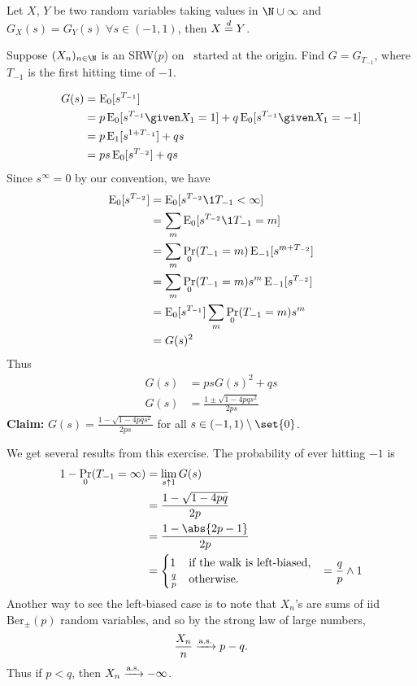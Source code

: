 \begin{fact} \label{thm:pgf}
    Let $X$, $Y$ be two random variables taking values in $\N \cup \infty$ and
    $G_X(s) = G_Y(s) \;\forall s \in (-1, 1)$, then $X \overset{d}{=} Y$.
\end{fact}

\begin{exercise}
    Suppose $(X_n)_{n \in \N}$ is an SRW($p$) on \Z\ started at the origin.
    Find $G = G_{T_{-1}}$, where $T_{-1}$ is the first hitting time of $-1$.
\end{exercise}
\begin{solution}
    \begin{align*}
        G(s) &= \E_0[s^{T_{-1}}] \\
            &= p \E_0[s^{T_{-1}} \given X_1 = 1]
                + q \E_0[s^{T_{-1}} \given X_1 = -1] \\
            &= p \E_1[s^{1 + T_{-1}}] + q s \\
            &= p s \E_0[s^{T_{-2}}] + q s
    \end{align*}
    Since $s^\infty = 0$ by our convention, we have \begin{align*}
        \E_0[s^{T_{-2}}] &= \E_0[s^{T_{-2}} \1{T_{-1} < \infty}] \\
            &= \sum_{m} \E_0[s^{T_{-2}} \1{T_{-1} = m}] \\
            &= \sum_{m} \Pr_0(T_{-1} = m) \E_{-1}[s^{m + T_{-2}}] \\
            &= \sum_{m} \Pr_0(T_{-1} = m) s^m \E_{-1}[s^{T_{-2}}] \\
            &= \E_0[s^{T_{-1}}] \sum_{m} \Pr_0(T_{-1} = m) s^m \\
            &= G(s)^2
    \end{align*}
    Thus \begin{align*}
        G(s) &= p s G(s)^2 + q s \\
        G(s) &= \frac{1 \pm \sqrt{1 - 4pq s^2}}{2ps}
    \end{align*}
    \textbf{Claim:} $G(s) = \frac{1 - \sqrt{1 - 4pqs^2}}{2ps}$ for all
    $s \in (-1, 1) \setminus \set{0}$.
\end{solution}
We get several results from this exercise.
The probability of ever hitting $-1$ is \begin{align*}
    1 - \Pr_0(T_{-1} = \infty) &= \lim_{s \uparrow 1} G(s) \\
        &= \frac{1 - \sqrt{1 - 4pq}}{2p} \\
        &= \frac{1 - \abs{2p - 1}}{2p} \\
        &= \begin{cases}
            1 & \text{if the walk is left-biased,} \\
            \frac{q}{p} & \text{otherwise.}
        \end{cases}
        &= \frac{q}{p} \wedge 1
\end{align*}
Another way to see the left-biased case is to note that $X_n$'s are sums of
iid $\mathrm{Ber}_{\pm}(p)$ random variables, and so by the strong law of
large numbers, \[
    \frac{X_n}{n} \xrightarrow{\text{a.s.}} p - q.
\] Thus if $p < q$, then $X_n \xrightarrow{\text{a.s.}} -\infty$.

